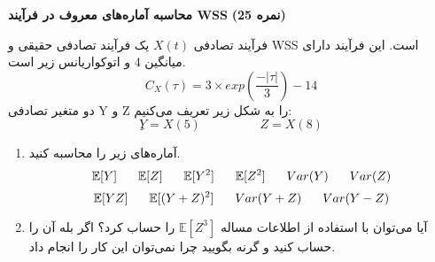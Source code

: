 \Large \textbf{محاسبه آماره‌های معروف در فرآیند WSS}
\large \textbf{(25 نمره)}

\normalsize \vspace{0.5cm}
فرآیند تصادفی
$ X(t) $
یک فرآیند تصادفی حقیقی و WSS است. این فرآیند دارای میانگین 4 و اتوکواریانس زیر است.
$$
C_X(\tau) = 3 \times exp(\frac{-|\tau|}{3}) - 14
$$
دو متغیر تصادفی Y و Z را به شکل زیر تعریف می‌کنیم:
$$
ِY = X(5)  \hspace{2cm} Z = X(8)
$$
\begin{enumerate}[label=(\alph*)]
	\item
آماره‌های زیر را محاسبه کنید.
$$
\mathbb{E}[Y] 
\hspace{0.6cm} 
\mathbb{E}[Z] 
\hspace{0.6cm}
\mathbb{E}[Y^2] 
\hspace{0.6cm} 
\mathbb{E}[Z^2] 
\hspace{0.6cm}
Var(Y)
\hspace{0.6cm} 
Var(Z)
$$
$$
\mathbb{E}[YZ] 
\hspace{0.6cm} 
\mathbb{E}[(Y+Z)^2] 
\hspace{0.6cm}
Var(Y + Z)
\hspace{0.6cm}
Var(Y - Z)
$$
	\item 
آیا می‌توان با استفاده از اطلاعات مساله
$ \mathbb{E}[Z^3] $
را حساب کرد؟ اگر بله آن را حساب کنید و گرنه بگویید چرا نمی‌توان این کار را انجام داد.
\end{enumerate}


